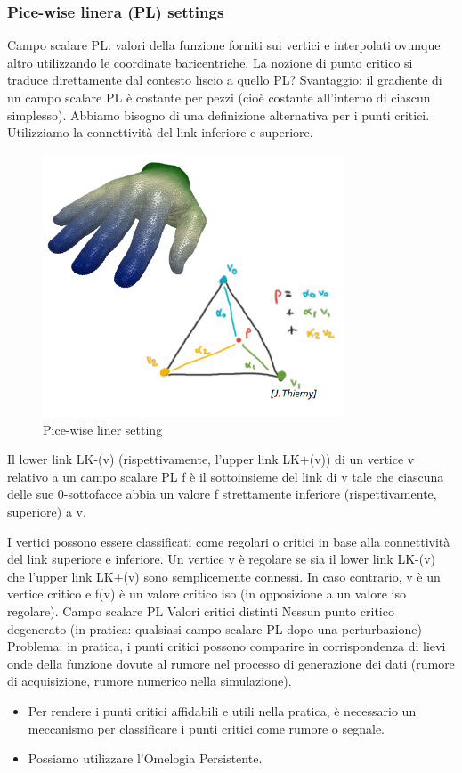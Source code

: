 \subsubsection{Pice-wise linera (PL) settings}
Campo scalare PL: valori della funzione forniti sui vertici e interpolati ovunque altro utilizzando le coordinate baricentriche.
La nozione di punto critico si traduce direttamente dal contesto liscio a quello PL?
Svantaggio: il gradiente di un campo scalare PL è costante per pezzi (cioè costante all'interno di ciascun simplesso). Abbiamo bisogno di una definizione alternativa per i punti critici. Utilizziamo la connettività del link inferiore e superiore.
\begin{figure}[H]
    \centering
    \includegraphics[width=0.8\textwidth]{images/Picewise.png} 
    \caption{Pice-wise liner setting}
    \label{fig:immagine}
\end{figure}
Il lower link LK-(v) (rispettivamente, l'upper link LK+(v)) di un vertice v relativo a un campo scalare PL f è il sottoinsieme del link di v tale che ciascuna delle sue 0-sottofacce abbia un valore f strettamente inferiore (rispettivamente, superiore) a v.

I vertici possono essere classificati come regolari o critici in base alla connettività del link superiore e inferiore. Un vertice v è regolare se sia il lower link LK-(v) che l'upper link LK+(v) sono semplicemente connessi. In caso contrario, v è un vertice critico e f(v) è un valore critico iso (in opposizione a un valore iso regolare).
Campo scalare PL
Valori critici distinti
Nessun punto critico degenerato
(in pratica: qualsiasi campo scalare PL dopo una perturbazione)
Problema: in pratica, i punti critici possono comparire in corrispondenza di lievi onde della funzione dovute al rumore nel processo di generazione dei dati (rumore di acquisizione, rumore numerico nella simulazione).
\begin{itemize}
    \item Per rendere i punti critici affidabili e utili nella pratica, è necessario un meccanismo per classificare i punti critici come rumore o segnale.
    \item Possiamo utilizzare l'Omelogia Persistente.
\end{itemize}


